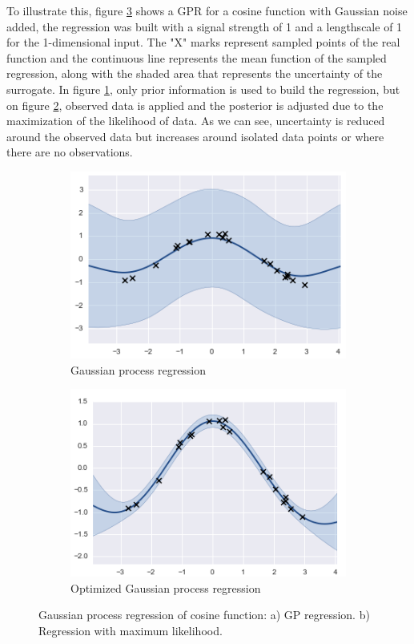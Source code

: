 \documentclass{article}
\begin{document}
To illustrate this, figure \ref{gp_regression} shows a GPR for a cosine function with Gaussian noise added, the regression was built with a signal strength of 1 and a lengthscale of 1 for the 1-dimensional input. The "X" marks represent sampled points of the real function and the continuous line represents the mean function of the sampled regression, along with the shaded area that represents the uncertainty of the surrogate. In figure \ref{gp}, only prior information is used to build the regression, but on figure \ref{gp_optimized}, observed data is applied and the posterior is adjusted due to the maximization of the likelihood of data. As we can see, uncertainty is reduced around the observed data but increases around isolated data points or where there are no observations.

\begin{figure}
\centering
	\begin{subfigure}[b]{0.4\textwidth}
        \includegraphics[width=\textwidth]{gp_cosine.png}
        \caption{Gaussian process regression}
        \label{gp}
	\end{subfigure}
    \hfill
	\begin{subfigure}[b]{0.4\textwidth}
        \includegraphics[width=\textwidth]{gp_cosine_optimized.png}
	    \caption{Optimized Gaussian process regression}
	    \label{gp_optimized}
	\end{subfigure}
\caption{Gaussian process regression of cosine function: a) GP regression. b) Regression with maximum likelihood.}
\label{gp_regression}
\end{figure}
\end{document}
